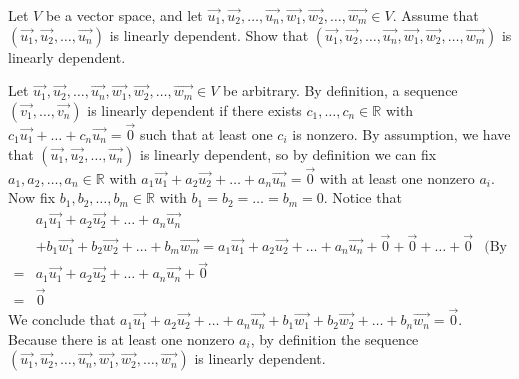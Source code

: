 \documentclass[12pt]{article}
\newenvironment{problem}[2][Problem]
{
	\begin{trivlist} 
		\item[\hskip \labelsep {\bfseries #1 #2:}]
	}
{
	\end{trivlist}
	}
\newenvironment{solution}[1][Solution]
{
	\begin{trivlist} 
		\item[\hskip \labelsep {\itshape #1:}]
	}
	{
	\end{trivlist}
}
\begin{document}
\begin{problem}{1}
Let $V$ be a vector space, and let $\vec{u_1},\vec{u_2}, \dots , \vec{u_n},\vec{w_1},\vec{w_2}, \dots , \vec{w_m} \in V$. Assume that $(\vec{u_1},\vec{u_2}, \dots , \vec{u_n})$ is linearly dependent. Show that $(\vec{u_1},\vec{u_2}, \dots , \vec{u_n},\vec{w_1},\vec{w_2}, \dots , \vec{w_m})$ is linearly dependent.
\noindent
\newline
\newline
\begin{solution}
Let $\vec{u_1},\vec{u_2}, \dots , \vec{u_n},\vec{w_1},\vec{w_2}, \dots , \vec{w_m} \in V$ be arbitrary.
By definition, a sequence $(\vec{v_1}, \dots , \vec{v_n})$ is linearly dependent if there exists $c_1, \dots , c_n \in \mathbb{R}$ with $c_1 \vec{u_1} + \dots + c_n \vec{u_n} = \vec{0}$ such that at least one $c_i$ is nonzero. By assumption, we have that $(\vec{u_1},\vec{u_2}, \dots , \vec{u_n})$ is linearly dependent, so by definition we can fix $a_1, a_2, \dots , a_n \in \mathbb{R}$ with $a_1 \vec{u_1} + a_2 \vec{u_2} + \dots + a_n \vec{u_n} = \vec{0}$ with at least one nonzero $a_i$. Now fix $b_1, b_2, \dots , b_m \in \mathbb{R}$ with $b_1 = b_2 = \dots = b_m = 0$. Notice that
\begin{align*}
&a_1 \vec{u_1} + a_2 \vec{u_2} + \dots + a_n \vec{u_n}  & &\\
&+ b_1 \vec{w_1} + b_2 \vec{w_2} + \dots + b_m \vec{w_m} = a_1 \vec{u_1} + a_2 \vec{u_2} + \dots + a_n \vec{u_n}+ \vec{0} + \vec{0} + \dots + \vec{0} & \text{(By Proposition 4.1.11)} \\
=&  a_1 \vec{u_1} + a_2 \vec{u_2} + \dots + a_n \vec{u_n} + \vec{0} & \\
=& \vec{0}
\end{align*}
We conclude that $a_1 \vec{u_1} + a_2 \vec{u_2} + \dots + a_n \vec{u_n} + b_1 \vec{w_1} + b_2 \vec{w_2} + \dots + b_n \vec{w_n} =\vec{0}$. Because there is at least one nonzero $a_i$, by definition the sequence $(\vec{u_1},\vec{u_2}, \dots , \vec{u_n},\vec{w_1},\vec{w_2}, \dots , \vec{w_n})$ is linearly dependent.
\end{solution}
\end{problem}
\end{document}
